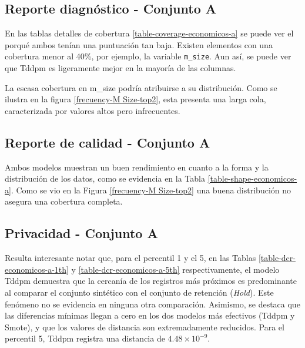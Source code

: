 \newpage
\subsection{Reporte diagnóstico - Conjunto A}
\label{diagnostico-conjunto-a}
En las tablas detalles de cobertura \ref{table-coverage-economicos-a} se puede ver el porqué ambos tenían una puntuación tan baja. Existen elementos con una cobertura menor al 40\%, por ejemplo, la variable \texttt{m\_size}. Aun así, se puede ver que Tddpm es ligeramente mejor en la mayoría de las columnas.

La escasa cobertura en m\_size podría atribuirse a su distribución. Como se ilustra en la figura \ref{frecuency-M Size-top2}, esta presenta una larga cola, caracterizada por valores altos pero infrecuentes.

\newpage
\subsection{Reporte de calidad - Conjunto A}
\label{calidad-conjunto-a}
Ambos modelos muestran un buen rendimiento en cuanto a la forma y la distribución de los datos, como se evidencia en la Tabla \ref{table-shape-economicos-a}. Como se vio en la Figura  \ref{frecuency-M Size-top2} una buena distribución no asegura una cobertura completa.



\newpage
\subsection{Privacidad - Conjunto A}
\label{privacidad-conjunto-a}
Resulta interesante notar que, para el percentil 1 y el 5, en las Tablas \ref{table-dcr-economicos-a-1th} y \ref{table-dcr-economicos-a-5th} respectivamente, el modelo Tddpm demuestra que la cercanía de los registros más próximos es predominante al comparar el conjunto sintético con el conjunto de retención (\emph{Hold}). Este fenómeno no se evidencia en ninguna otra comparación. Asimismo, se destaca que las diferencias mínimas llegan a cero en los dos modelos más efectivos (Tddpm y Smote), y que los valores de distancia son extremadamente reducidos. Para el percentil 5, Tddpm registra una distancia de $4.48 \times 10^{-9}$.




